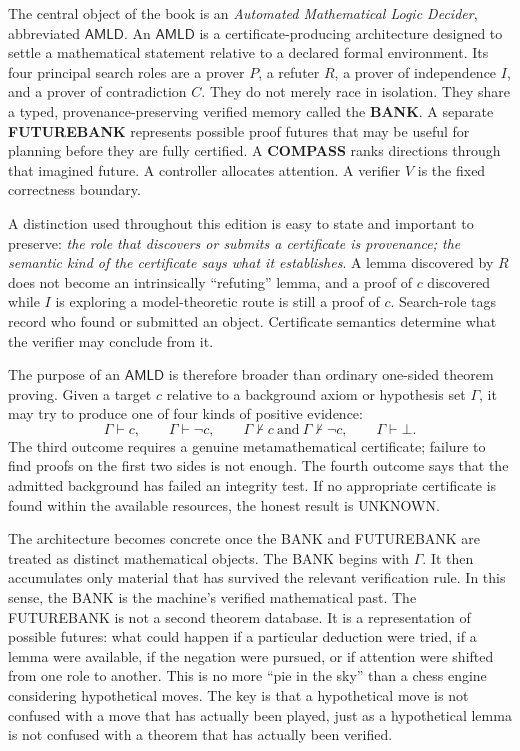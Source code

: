 \documentclass[11pt,openany]{book}
\theoremstyle{definition}
\theoremstyle{remark}
\newcommand{\AMLD}{\ensuremath{\mathsf{AMLD}}\xspace}
\newcommand{\botc}{\bot}
\begin{document}
The central object of the book is an \emph{Automated Mathematical Logic Decider}, abbreviated \AMLD. An \AMLD is a certificate-producing architecture designed to settle a mathematical statement relative to a declared formal environment. Its four principal search roles are a prover $P$, a refuter $R$, a prover of independence $I$, and a prover of contradiction $C$. They do not merely race in isolation. They share a typed, provenance-preserving verified memory called the \textbf{BANK}. A separate \textbf{FUTUREBANK} represents possible proof futures that may be useful for planning before they are fully certified. A \textbf{COMPASS} ranks directions through that imagined future. A controller allocates attention. A verifier $V$ is the fixed correctness boundary.

A distinction used throughout this edition is easy to state and important to preserve: \emph{the role that discovers or submits a certificate is provenance; the semantic kind of the certificate says what it establishes}. A lemma discovered by $R$ does not become an intrinsically ``refuting'' lemma, and a proof of $c$ discovered while $I$ is exploring a model-theoretic route is still a proof of $c$. Search-role tags record who found or submitted an object. Certificate semantics determine what the verifier may conclude from it.

The purpose of an \AMLD is therefore broader than ordinary one-sided theorem proving. Given a target $c$ relative to a background axiom or hypothesis set $\Gamma$, it may try to produce one of four kinds of positive evidence:
\[
\Gamma\vdash c,\qquad
\Gamma\vdash \neg c,\qquad
\Gamma\nvdash c\ \text{and}\ \Gamma\nvdash\neg c,\qquad
\Gamma\vdash\botc.
\]
The third outcome requires a genuine metamathematical certificate; failure to find proofs on the first two sides is not enough. The fourth outcome says that the admitted background has failed an integrity test. If no appropriate certificate is found within the available resources, the honest result is \textsf{UNKNOWN}.

The architecture becomes concrete once the BANK and FUTUREBANK are treated as distinct mathematical objects. The BANK begins with $\Gamma$. It then accumulates only material that has survived the relevant verification rule. In this sense, the BANK is the machine's verified mathematical past. The FUTUREBANK is not a second theorem database. It is a representation of possible futures: what could happen if a particular deduction were tried, if a lemma were available, if the negation were pursued, or if attention were shifted from one role to another. This is no more ``pie in the sky'' than a chess engine considering hypothetical moves. The key is that a hypothetical move is not confused with a move that has actually been played, just as a hypothetical lemma is not confused with a theorem that has actually been verified.
\end{document}

